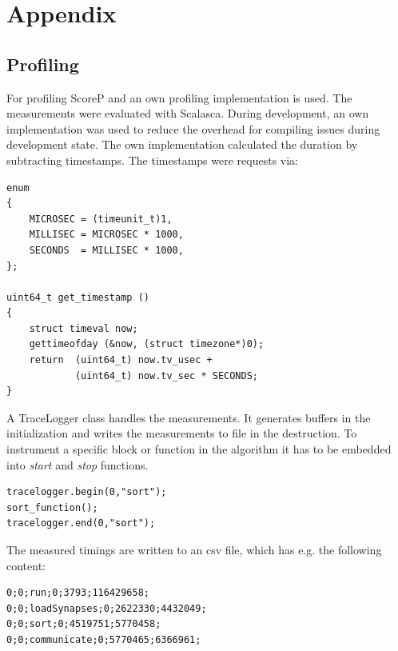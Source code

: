 %

\chapter{Appendix}

\section{Profiling}

For profiling ScoreP and an own profiling implementation is used.
The measurements were evaluated with Scalasca.
During development, an own implementation was used to reduce the overhead for compiling issues during development state.
The own implementation calculated the duration by subtracting timestamps.
The timestamps were requests via:
\begin{lstlisting}
enum
{
	MICROSEC = (timeunit_t)1,
	MILLISEC = MICROSEC * 1000,
	SECONDS  = MILLISEC * 1000,
};

uint64_t get_timestamp ()
{
    struct timeval now;
    gettimeofday (&now, (struct timezone*)0);
    return  (uint64_t) now.tv_usec + 
            (uint64_t) now.tv_sec * SECONDS;
}
\end{lstlisting}

A TraceLogger class handles the measurements.
It generates buffers in the initialization and writes the measurements to file in the destruction.
To instrument a specific block or function in the algorithm it has to be embedded into \emph{start} and \emph{stop} functions.
\begin{lstlisting}
tracelogger.begin(0,"sort");
sort_function();
tracelogger.end(0,"sort");
\end{lstlisting}

The measured timings are written to an csv file, which has e.g. the following content:
\begin{lstlisting}
0;0;run;0;3793;116429658;
0;0;loadSynapses;0;2622330;4432049;
0;0;sort;0;4519751;5770458;
0;0;communicate;0;5770465;6366961;
\end{lstlisting}

